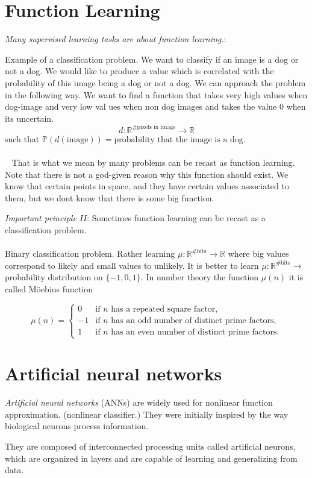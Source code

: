 \documentclass[../main.tex]{subfiles}
\begin{document}
	\section{Function Learning}
	\noindent 
	\textit{Many supervised learning tasks are about function learning.}:  

\begin{xmpl} Example of a classification problem. We want to classify if an image is a dog or not a dog. We would like to produce a value which is correlated with the probability of this image being a dog or not a dog.  We can approach the problem in the following way. We want to find a function that takes very high values when dog-image and very low val ues when non dog images and takes the value 0 when its uncertain. 
	$$d: \mathbb{R}^{\# \text{pixels in image}} \rightarrow \mathbb{R} $$
	such that $\mathbb{P}(d(\text{image})) = \text{probability that the image is a dog.}$ \\ \\  
	That is what we mean by many problems can be recast as function learning. Note that there is not a god-given reason why this function should exist. We know that certain points in space, and they have certain values associated to them, but we dont know that there is some big function. 
\end{xmpl}

\noindent \textit{Important principle $II$}: Sometimes function learning can be recast as a classification problem.  
\\ \\ 
Binary classification problem. 
Rather learning $\mu : \mathbb{R}^{\# \text{bits}} \rightarrow \mathbb{R}$ where big values correspond to likely and small values to unlikely. It is better to learn $\mu : \mathbb{R}^{\# \text{bits}} \rightarrow $ probability distribution on $\{-1,0,1\}$. In number theory the function $\mu(n)$ it is called Möebius function 

\[
\mu(n) = \begin{cases}
	0 & \text{if } n \text{ has a repeated square factor}, \\
	-1 & \text{if } n \text{ has an odd number of distinct prime factors}, \\
	1 & \text{if } n \text{ has an even number of distinct prime factors}.
\end{cases}
\]

	
	
\section{Artificial neural networks }

\noindent \textit{Artificial neural networks} (ANNs) are widely used for nonlinear function approximation.
(nonlinear classifier.)  They were initially inspired by the way biological neurons process information. 

They are composed of interconnected processing units called artificial neurons, which are organized in layers and are capable of learning and generalizing from data.	
	
\end{document}
